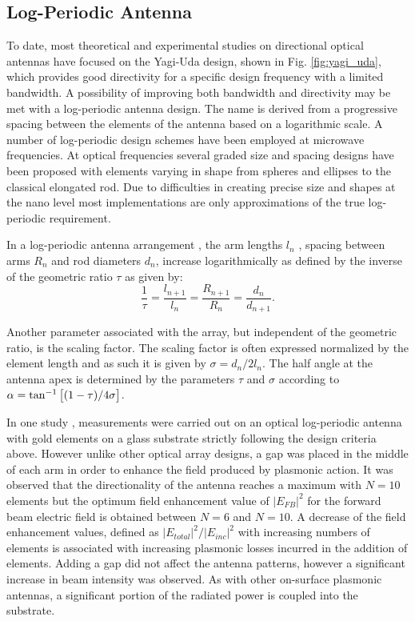 \documentclass[11pt]{article}
\begin{document}
\subsection{Log-Periodic Antenna}
%
To date, most theoretical and experimental studies on directional optical antennas have focused on the Yagi-Uda design, shown in Fig. \ref{fig:yagi_uda}, which provides good directivity for a specific design frequency with a limited bandwidth. A possibility of improving both bandwidth and directivity may be met with a log-periodic antenna design. The name is derived from a progressive spacing between the elements of the antenna based on a logarithmic scale. A number of log-periodic design schemes have been employed at microwave frequencies. At optical frequencies several graded size and spacing designs have been proposed with elements varying in shape from spheres and ellipses to the classical elongated rod. Due to difficulties in creating precise size and shapes at the nano level most implementations are only approximations of the true log-periodic requirement.

In a log-periodic antenna arrangement \cite{Balanis2015}, the arm lengths $l_n$ , spacing between arms $R_n$ and rod diameters $d_n$, increase logarithmically as defined by the inverse of the geometric ratio  $\tau$ as given by:
%
\begin{equation}
  \frac{1}{\tau} = \frac{l_{n + 1}}{l_n} = \frac{R_{n + 1}}{R_n} = \frac{d_n}{d_{n + 1}}.
  \label{eq:logperiodic}
\end{equation}

Another parameter associated with the array, but independent of the geometric ratio, is the scaling factor. The scaling factor is often expressed normalized by the element length and as such it is given by $\sigma  = d_n/ {2 l_n}$. The half angle at the antenna apex is determined by the parameters $\tau$ and $\sigma$ according to $\alpha  = \tan ^{-1}\left[(1 - \tau)/{4 \sigma} \right]$.

In one study \cite{Pavlov2012}, measurements were carried out on an optical log-periodic antenna with gold elements on a glass substrate strictly following the design criteria above. However unlike other optical array designs, a gap was placed in the middle of each arm in order to enhance the field produced by plasmonic action. It was observed that the directionality of the antenna reaches a maximum with $N = 10$ elements but the optimum field enhancement value of $|E_{FB}|^2$ for the forward beam electric field is obtained between $N = 6$ and $N = 10$. A decrease of the field enhancement values, defined as $|E_{total}|^2/|E_{inc}|^2$ with increasing numbers of elements is associated with increasing plasmonic losses incurred in the addition of elements. Adding a gap did not affect the antenna patterns, however a significant increase in beam intensity was observed. As with other on-surface plasmonic antennas, a significant portion of the radiated power is coupled into the substrate.
\end{document}
